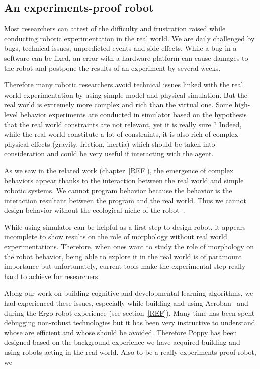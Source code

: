 \subsection{An experiments-proof robot} %

Most researchers can attest of the difficulty and frustration raised while conducting robotic experimentation in the real world. We are daily challenged by bugs, technical issues, unpredicted events and side effects. While a bug in a software can be fixed, an error with a hardware platform can cause damages to the robot and postpone the results of an experiment by several weeks.

Therefore many robotic researchers avoid technical issues linked with the real world experimentation by using simple model and physical simulation. But the real world is extremely more complex and rich than the virtual one.
Some high-level behavior experiments are conducted in simulator based on the hypothesis that the real world constraints are not relevant, yet it is really sure ?
Indeed, while the real world constitute a lot of constraints, it is also rich of complex physical effects (gravity, friction, inertia) which should be taken into consideration and could be very useful if interacting with the agent.

As we saw in the related work (chapter~\ref{REF}), the emergence of complex behaviors appear thanks to the interaction between the real world and simple robotic systems. We cannot program behavior because the behavior is the interaction resultant between the program and the real world. Thus we cannot design behavior without the ecological niche of the robot~\cite{Steels1991emergence}.

While using simulator can be helpful as a first step to design robot, it appears incomplete to show results on the role of morphology without real world experimentations.
Therefore, when ones want to study the role of morphology on the robot behavior, being able to explore it in the real world is of paramount importance but unfortunately, current tools make the experimental step really hard to achieve for researchers.

Along our work on building cognitive and developmental learning algorithms, we had experienced these issues, especially while building and using Acroban~\cite{Ly2010} and during the Ergo robot experience (see section~\ref{REF}). Many time has been spent debugging non-robust technologies but it has been very instructive to understand whose are efficient and whose should be avoided.
Therefore Poppy has been designed based on the background experience we have acquired building and using robots acting in the real world. Also to be a really experiments-proof robot, we

